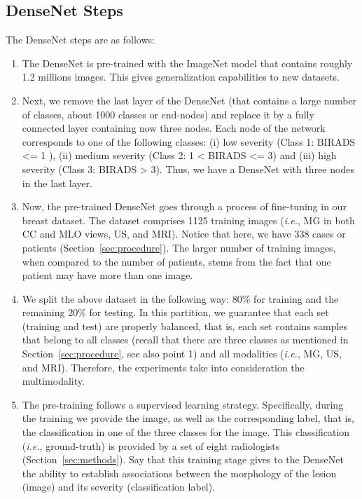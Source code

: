 \subsection{DenseNet Steps}
\label{sec:app003001004}

\hfill

\noindent
The DenseNet steps are as follows:

\hfill

\begin{enumerate}
\item The DenseNet is pre-trained with the ImageNet model that contains roughly 1.2 millions images. This gives generalization capabilities to new datasets.
\item Next, we remove the last layer of the DenseNet (that contains a large number of classes, about 1000 classes or end-nodes) and replace it by a fully connected layer containing now three nodes. Each node of the network corresponds to one of the following classes: (i) low severity (Class 1: BIRADS <= 1 ), (ii) medium severity  (Class 2:  1 < BIRADS <= 3) and (iii) high severity (Class 3: BIRADS > 3). Thus, we have a DenseNet with three nodes in the last layer.
\hfill
\item Now, the pre-trained DenseNet goes through a process of fine-tuning in our breast dataset. The dataset comprises 1125 training images ({\it i.e.}, MG in both CC and MLO views, US, and MRI). Notice that here, we have 338 cases or patients (Section~\ref{sec:procedure}). The larger number of training images, when compared to the number of patients, stems from the fact that one patient may have more than one image.
\hfill
\item We split the above dataset in the following way: 80\% for training and the remaining 20\% for testing. In this partition, we guarantee that each set (training and test) are properly balanced, that is, each set contains samples that belong to all classes (recall that there are three classes as mentioned in Section~\ref{sec:procedure}, see also point 1) and all modalities ({\it i.e.}, MG, US, and MRI). Therefore, the experiments take into consideration the multimodality.
\hfill
\item The pre-training follows a supervised learning strategy. Specifically, during the training we provide the image, as well as the corresponding label, that is, the classification in one of the three classes for the image. This classification ({\it i.e.}, ground-truth) is provided by a set of eight radiologists (Section~\ref{sec:methods}). Say that this training stage gives to the DenseNet the ability to establish associations between the morphology of the lesion (image) and its severity (classification label).

\end{enumerate}
